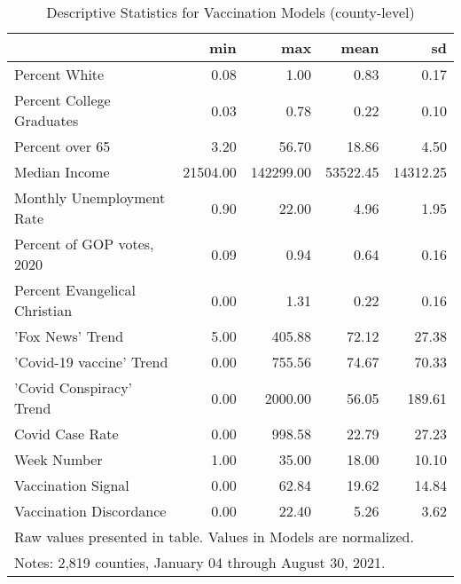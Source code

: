 \begin{table}[!ht]

\caption{\label{tab:vacc-desc-table}Descriptive Statistics for Vaccination Models (county-level)}
\centering
\begin{tabular}{lrrrr}
\toprule
  & min & max & mean & sd\\
\midrule
Percent White & \num{0.08} & \num{1.00} & \num{0.83} & \num{0.17}\\
Percent College Graduates & \num{0.03} & \num{0.78} & \num{0.22} & \num{0.10}\\
Percent over 65 & \num{3.20} & \num{56.70} & \num{18.86} & \num{4.50}\\
Median Income & \num{21504.00} & \num{142299.00} & \num{53522.45} & \num{14312.25}\\
Monthly Unemployment Rate & \num{0.90} & \num{22.00} & \num{4.96} & \num{1.95}\\
Percent of GOP votes, 2020 & \num{0.09} & \num{0.94} & \num{0.64} & \num{0.16}\\
Percent Evangelical Christian & \num{0.00} & \num{1.31} & \num{0.22} & \num{0.16}\\
'Fox News' Trend & \num{5.00} & \num{405.88} & \num{72.12} & \num{27.38}\\
'Covid-19 vaccine' Trend & \num{0.00} & \num{755.56} & \num{74.67} & \num{70.33}\\
'Covid Conspiracy' Trend & \num{0.00} & \num{2000.00} & \num{56.05} & \num{189.61}\\
Covid Case Rate & \num{0.00} & \num{998.58} & \num{22.79} & \num{27.23}\\
Week Number & \num{1.00} & \num{35.00} & \num{18.00} & \num{10.10}\\
Vaccination Signal & \num{0.00} & \num{62.84} & \num{19.62} & \num{14.84}\\
Vaccination Discordance & \num{0.00} & \num{22.40} & \num{5.26} & \num{3.62}\\
\bottomrule
\multicolumn{5}{l}{\rule{0pt}{1em}Raw values presented in table. Values in Models are normalized.}\\
\multicolumn{5}{l}{\rule{0pt}{1em}Notes: 2,819 counties, January 04 through August 30, 2021.}\\
\end{tabular}
\end{table}